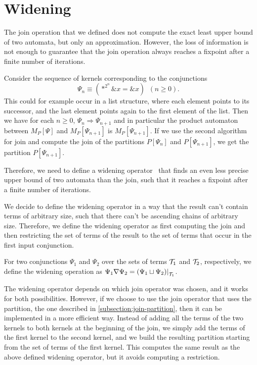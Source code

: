 \section{Widening}

The join operation that we defined does not compute the exact least upper bound of two automata, but only an approximation.
However, the loss of information is not enough to guarantee that the join operation always reaches a fixpoint after a finite number of iterations.

\begin{example}
  Consider the sequence of kernels corresponding to the conjunctions
  \[
    \Psi_n \equiv (*^{2^n} \&x = \&x)\hspace{6pt} (n\geq 0).
  \]
  This could for example occur in a list structure, where each element points to its successor, and the last element points again to the first element of the list.
  Then we have for each $n \geq 0$, $\Psi_n \Longrightarrow \Psi_{n+1}$ and in particular the product automaton between $M_P[\Psi]$ and $M_P[\Psi_{n+1}]$ is $M_P[\Psi_{n+1}]$.
  If we use the second algorithm for join and compute the join of the partitions $P[\Psi_n]$ and $P[\Psi_{n+1}]$, we get the partition $P[\Psi_{n+1}]$.
\end{example}

Therefore, we need to define a widening operator~\cite{widening} that finds an even less precise upper bound of two automata than the join, such that it reaches a fixpoint after a finite number of iterations.

We decide to define the widening operator in a way that the result can't contain terms of arbitrary size, such that there can't be ascending chains of arbitrary size.
Therefore, we define the widening operator as first computing the join and then restricting the set of terms of the result to the set of terms that occur in the first input conjunction.

\begin{definition}
  For two conjunctions $\Psi_1$ and $\Psi_2$ over the sets of terms $\mathcal{T}_1$ and $\mathcal{T}_2$, respectively, we define the widening operation as
  $\Psi_1 \widen \Psi_2 = \restr{(\Psi_1 \join \Psi_2)}{\T_1}$.
\end{definition}

The widening operator depends on which join operator was chosen, and it
works for both possibilities.
However, if we choose to use the join operator that uses the partition, the one described in \cref{subsection:join-partition},
then it can be implemented in a more efficient way.
Instead of adding all the terms of the two kernels to both kernels at the beginning of the join,
we simply add the terms of the first kernel to the second kernel,
and we build the resulting partition starting from the set of terms of the first kernel.
This computes the same result as the above defined widening operator,
but it avoids computing a restriction.

